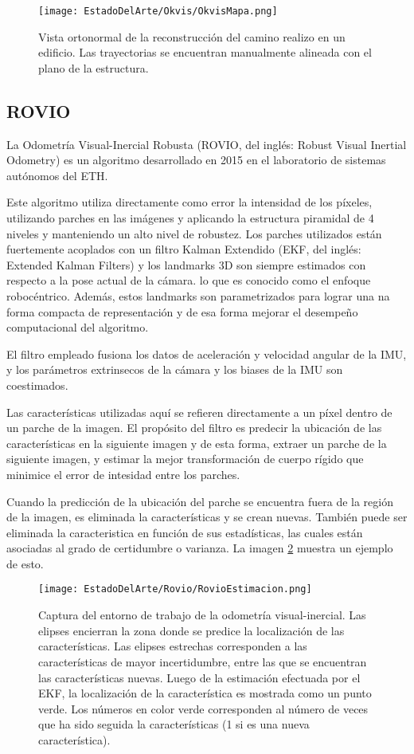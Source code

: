 \begin{figure}[H]
	\centering
	\texttt{[image: EstadoDelArte/Okvis/OkvisMapa.png]}
	\caption{Vista ortonormal de la reconstrucción del camino realizo en un edificio. Las trayectorias se encuentran manualmente alineada con el plano de la estructura.}
	\label{fig:RovioEstimacionMapa}
\end{figure}


\subsection{ROVIO}

La Odometría Visual-Inercial Robusta (ROVIO, del inglés: Robust Visual Inertial Odometry) es un algoritmo desarrollado en 2015 en el laboratorio de sistemas autónomos del ETH.

Este algoritmo utiliza directamente como error la intensidad de los píxeles, utilizando parches en las  imágenes y aplicando la estructura piramidal de 4 niveles y manteniendo un alto nivel de robustez. Los parches utilizados están fuertemente acoplados con un filtro Kalman Extendido (EKF, del inglés: Extended Kalman Filters) y los landmarks 3D son siempre estimados con respecto a la pose actual de la cámara. lo que es conocido como el enfoque robocéntrico. Además, estos landmarks son parametrizados para lograr una na forma compacta de representación y de esa forma mejorar el desempeño computacional del algoritmo. 

El filtro empleado fusiona los datos de aceleración y velocidad angular de la IMU, y los parámetros extrinsecos de la cámara y los biases de la IMU son coestimados. 

Las características utilizadas aquí se refieren directamente a un píxel dentro de un parche de la imagen. El propósito del filtro es predecir la ubicación de las características en la siguiente imagen y de esta forma, extraer un parche de la siguiente imagen, y estimar la mejor transformación de cuerpo rígido que minimice el error de intesidad entre los parches. 

Cuando la predicción de la ubicación del parche se encuentra fuera de la región de la imagen, es eliminada la características y se crean nuevas. También puede ser eliminada la caracteristica en función de sus estadísticas, las cuales están asociadas al grado de certidumbre o varianza. La imagen \ref{fig:RovioEstimacion} muestra un ejemplo de esto.

\begin{figure}[H]
	\centering
	\texttt{[image: EstadoDelArte/Rovio/RovioEstimacion.png]}
	\caption{Captura del entorno de trabajo de la odometría visual-inercial. Las elipses encierran la zona donde se predice la localización de las características. Las elipses estrechas corresponden a las características de mayor incertidumbre, entre las que se encuentran las características nuevas. Luego de la estimación efectuada por el EKF, la localización de la característica es mostrada como un punto verde. Los números en color verde corresponden al número de veces que ha sido seguida la características (1 si es una nueva característica).}
	\label{fig:RovioEstimacion}
\end{figure}


